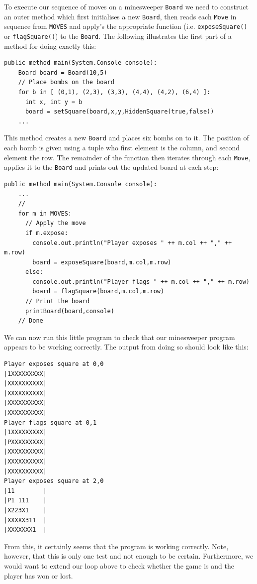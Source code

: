 To execute our sequence of moves on a minesweeper \lstinline{Board} we need to construct an outer method which first initialises a new \lstinline{Board}, then reads each \lstinline{Move} in sequence from \lstinline{MOVES} and apply's the appropriate function (i.e. \lstinline{exposeSquare()} or \lstinline{flagSquare()}) to the \lstinline{Board}.  The following illustrates the first part of a method for doing exactly this:
\begin{lstlisting}
public method main(System.Console console):
    Board board = Board(10,5)
    // Place bombs on the board
    for b in [ (0,1), (2,3), (3,3), (4,4), (4,2), (6,4) ]:
      int x, int y = b
      board = setSquare(board,x,y,HiddenSquare(true,false))
    ...
\end{lstlisting}

This method creates a new \lstinline{Board} and places six bombs on to it.  The position of each bomb is given using a tuple who first element is the column, and second element the row.  The remainder of the function then iterates through each \lstinline{Move}, applies it to the \lstinline{Board} and prints out the updated board at each step:

\begin{lstlisting}
public method main(System.Console console):
    ...
    //
    for m in MOVES:
      // Apply the move
      if m.expose:
        console.out.println("Player exposes " ++ m.col ++ "," ++ m.row)
        board = exposeSquare(board,m.col,m.row)
      else:
        console.out.println("Player flags " ++ m.col ++ "," ++ m.row)
        board = flagSquare(board,m.col,m.row)
      // Print the board
      printBoard(board,console)
    // Done
\end{lstlisting}

We can now run this little program to check that our minesweeper program appears to be working correctly.  The output from doing so should look like this:

\begin{lstlisting}
Player exposes square at 0,0
|1XXXXXXXXX|
|XXXXXXXXXX|
|XXXXXXXXXX|
|XXXXXXXXXX|
|XXXXXXXXXX|
Player flags square at 0,1
|1XXXXXXXXX|
|PXXXXXXXXX|
|XXXXXXXXXX|
|XXXXXXXXXX|
|XXXXXXXXXX|
Player exposes square at 2,0
|11        |
|P1 111    |
|X223X1    |
|XXXXX311  |
|XXXXXXX1  |
\end{lstlisting}
From this, it certainly seems that the program is working correctly.  Note, however, that this is only one test and not enough to be certain.  Furthermore, we would want to extend our loop above to check whether the game is and the player has won or lost.
